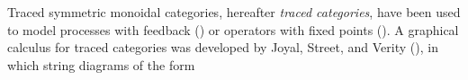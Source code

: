 \documentclass[12pt,oneside,article,draft]{memoir}
\begin{document}
Traced symmetric monoidal categories, hereafter \emph{traced categories}, have been used to model processes with feedback (\cite{http://arxiv.org/pdf/1401.5113v1.pdf})  or operators with fixed points (\cite{http://arxiv.org/pdf/1107.6032.pdf}). A graphical calculus for traced categories was developed by Joyal, Street, and Verity (\cite{JoyalStreetVerity}), in which string diagrams of the form
%
%
%
%
%
%
%
%
\end{document}
